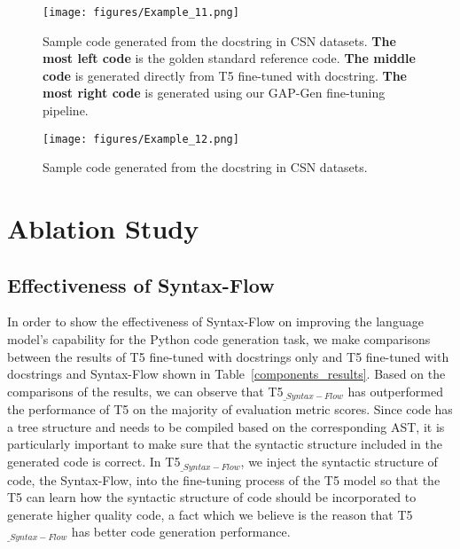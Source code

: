 \documentclass[11pt]{article}
\begin{document}
\begin{figure*}[h!] 
\centering
\texttt{[image: figures/Example\_11.png]}
\caption{Sample code generated from the docstring in CSN datasets. \textbf{The most left code} is the golden standard reference code. \textbf{The middle code} is generated directly from T5 fine-tuned with docstring. \textbf{The most right code} is generated using our GAP-Gen fine-tuning pipeline.}
\label{fig:example_4}
\end{figure*}


\begin{figure*}[h!] 
\centering
\texttt{[image: figures/Example\_12.png]}
\caption{Sample code generated from the docstring in CSN datasets.}
\label{fig:example_5}
\end{figure*}




\section{Ablation Study}








\subsection{Effectiveness of Syntax-Flow}
In order to show the effectiveness of Syntax-Flow on improving the language model's capability for the Python code generation task, we make comparisons between the results of T5 fine-tuned with docstrings only and T5 fine-tuned with docstrings and Syntax-Flow shown in Table~\ref{components_results}. Based on the comparisons of the results, we can observe that T5$_{\_{Syntax-Flow}}$ has outperformed the performance of T5 on the majority of evaluation metric scores.  Since code has a tree structure and needs to be compiled based on the corresponding AST, it is particularly important to make sure that the syntactic structure included in the generated code is correct. In T5$_{\_{Syntax-Flow}}$, we inject the syntactic structure of code, the Syntax-Flow, into the fine-tuning process of the T5 model so that the T5 can learn how the syntactic structure of code should be incorporated to generate higher quality code, a fact which we believe is the reason that T5$_{\_{Syntax-Flow}}$ has better code generation performance. 
\end{document}
